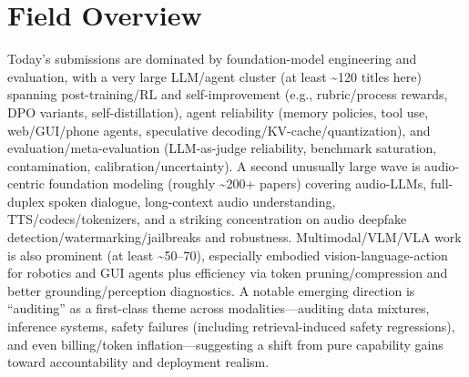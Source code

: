 \documentclass[12pt,letterpaper]{article}
\begin{document}
\section*{Field Overview}
{\footnotesize Today's submissions are dominated by foundation-model engineering and evaluation, with a very large LLM/agent cluster (at least \textasciitilde{}120 titles here) spanning post-training/RL and self-improvement (e.g., rubric/process rewards, DPO variants, self-distillation), agent reliability (memory policies, tool use, web/GUI/phone agents, speculative decoding/KV-cache/quantization), and evaluation/meta-evaluation (LLM-as-judge reliability, benchmark saturation, contamination, calibration/uncertainty). A second unusually large wave is audio-centric foundation modeling (roughly \textasciitilde{}200+ papers) covering audio-LLMs, full-duplex spoken dialogue, long-context audio understanding, TTS/codecs/tokenizers, and a striking concentration on audio deepfake detection/watermarking/jailbreaks and robustness. Multimodal/VLM/VLA work is also prominent (at least \textasciitilde{}50--70), especially embodied vision-language-action for robotics and GUI agents plus efficiency via token pruning/compression and better grounding/perception diagnostics. A notable emerging direction is ``auditing'' as a first-class theme across modalities---auditing data mixtures, inference systems, safety failures (including retrieval-induced safety regressions), and even billing/token inflation---suggesting a shift from pure capability gains toward accountability and deployment realism.}
\end{document}
